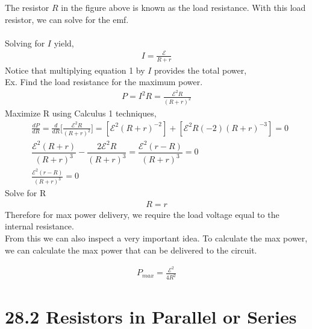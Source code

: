 \documentclass[12pt, titlepage, oneside]{article}
\begin{document}
The resistor $R$ in the figure above is known as the load resistance. With this load resistor, we can solve for the emf.\\

\noindent{}\\

Solving for $ I  $ yield,
\begin{align*}
	I = \frac{\mathscr{E}}{R+r}
\end{align*}
Notice that multiplying equation 1 by $ I $ provides the total power,\\

\noindent{}
\newpage
Ex. Find the load resistance for the maximum power.
\begin{align*}
P = I^2R = \frac{\mathscr{E}^2R}{(R+r)^2}
\end{align*}
Maximize R using Calculus 1 techniques, 
\begin{align*}
&\frac{dP}{dR} = \frac{d}{dR} \Bigg[\frac{\mathscr{E}^2R}{(R+r)^2}\Bigg] = [\mathscr{E}^2(R+r)^{-2}] + [\mathscr{E}^2R(-2)(R+r)^{-3}]=0\\
&\dfrac{\mathscr{E}^2(R+r)}{(R+r)^3} - \dfrac{2 \mathscr{E}^2R}{(R+r)^3} = \dfrac{\mathscr{E}^2(r-R)}{(R+r)^3} = 0\\
&\frac{\mathscr{E}^2(r-R)}{(R+r)^3} = 0
\end{align*}
Solve for R
\begin{align*}
R=r
\end{align*}
Therefore for max power delivery, we require the load voltage equal to the internal resistance.\\

From this we can also inspect a very important idea. To calculate the max power, we can calculate the max power that can be delivered to the circuit.

\begin{align*}
P_{max} = \frac{\mathscr{E}^2}{4R^2}
\end{align*}
\section*{28.2 Resistors in Parallel or Series}
\end{document}
